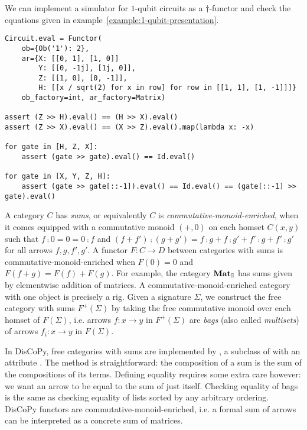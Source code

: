 \begin{example}
We can implement a simulator for $1$-qubit circuits as a $\dagger$-functor and check the equations given in example~\ref{example:1-qubit-presentation}.

\begin{verbatim}
Circuit.eval = Functor(
    ob={Ob('1'): 2},
    ar={X: [[0, 1], [1, 0]]
        Y: [[0, -1j], [1j, 0]],
        Z: [[1, 0], [0, -1]],
        H: [[x / sqrt(2) for x in row] for row in [[1, 1], [1, -1]]]}
    ob_factory=int, ar_factory=Matrix)

assert (Z >> H).eval() == (H >> X).eval()
assert (Z >> X).eval() == (X >> Z).eval().map(lambda x: -x)

for gate in [H, Z, X]:
    assert (gate >> gate).eval() == Id.eval()

for gate in [X, Y, Z, H]:
    assert (gate >> gate[::-1]).eval() == Id.eval() == (gate[::-1] >> gate).eval()
\end{verbatim}
\end{example}

A category $C$ has \emph{sums}, or equivalently $C$ is \emph{commutative-monoid-enriched}, when it comes equipped with a commutative monoid $(+, 0)$ on each homset $C(x, y)$ such that $f \fcmp 0 = 0 = 0 \fcmp f$ and $(f + f') \fcmp (g + g') = f \fcmp g + f \fcmp g' + f' \fcmp g + f' \fcmp g'$ for all arrows $f, g, f', g'$.
A functor $F : C \to D$ between categories with sums is commutative-monoid-enriched when $F(0) = 0$ and $F(f + g) = F(f) + F(g)$.
For example, the category $\mathbf{Mat}_\S$ has sums given by elementwise addition of matrices.
A commutative-monoid-enriched category with one object is precisely a rig.
Given a signature $\Sigma$, we construct the free category with sums $F^+(\Sigma)$ by taking the free commutative monoid over each homset of $F(\Sigma)$, i.e. arrows $f : x \to y$ in $F^+(\Sigma)$ are \emph{bags} (also called \emph{multisets}) of arrows $f_i : x \to y$ in $F(\Sigma)$.

In DisCoPy, free categories with sums are implemented by , a subclass of  with an attribute .
The method  is straightforward: the composition of a sum is the sum of the compositions of its terms.
Defining equality requires some extra care however: we want an arrow to be equal to the sum of just itself.
Checking equality of bags is the same as checking equality of lists sorted by any arbitrary ordering.
DisCoPy functors are commutative-monoid-enriched, i.e. a formal sum of arrows can be interpreted as a concrete sum of matrices.

